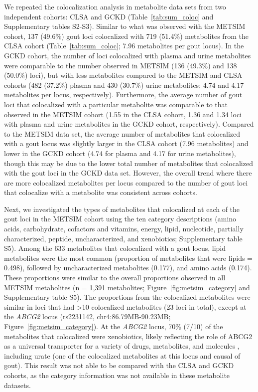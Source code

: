 \documentclass[gucdd,article,submit,pdftex,moreauthors]{Definitions/mdpi}
\begin{document}
We repeated the colocalization analysis in metabolite data sets from two independent cohorts: CLSA and GCKD (Table~\ref{tab:sum_coloc} and Supplementary tables S2-S3).
Similar to what was observed with the METSIM cohort, 137 (49.6\%) gout loci colocalized with 719 (51.4\%) metabolites from the CLSA cohort (Table~\ref{tab:sum_coloc}; 7.96 metabolites per gout locus).
In the GCKD cohort, the number of loci colocalized with plasma and urine metabolites were comparable to the number observed in METSIM (136 (49.3\%) and 138 (50.0\%) loci), but with less metabolites compared to the METSIM and CLSA cohorts (482 (37.2\%) plasma and 430 (30.7\%) urine metabolites; 4.74 and 4.17 metabolites per locus, respectively).
Furthermore, the average number of gout loci that colocalized with a particular metabolite was comparable to that observed in the METSIM cohort (1.55 in the CLSA cohort, 1.36 and 1.34 loci with plasma and urine metabolites in the GCKD cohort, respectively).
Compared to the METSIM data set, the average number of metabolites that colocalized with a gout locus was slightly larger in the CLSA cohort (7.96 metabolites) and lower in the GCKD cohort (4.74 for plasma and 4.17 for urine metabolites), though this may be due to the lower total number of metabolites that colocalized with the gout loci in the GCKD data set.
However, the overall trend where there are more colocalized metabolites per locus compared to the number of gout loci that colocalize with a metabolite was consistent across cohorts.

Next, we investigated the types of metabolites that colocalized at each of the gout loci in the METSIM cohort using the ten category descriptions (amino acids, carbohydrate, cofactors and vitamins, energy, lipid, nucleotide, partially characterized, peptide, uncharacterized, and xenobiotics; Supplementary table S5).
Among the 633 metabolites that colocalized with a gout locus, lipid metabolites were the most common (proportion of metabolites that were lipids = 0.498), followed by uncharacterized metabolites (0.177), and amino acids (0.174).
These proportions were similar to the overall proportions observed in all METSIM metabolites (n = 1,391 metabolites; Figure~\ref{fig:metsim_category} and Supplementary table S5).
The proportions from the colocalized metabolites were similar in loci that had >10 colocalized metabolites (23 loci in total), except at the \textit{ABCG2} locus (rs2231142, chr4:86.79MB-90.23MB; Figure~\ref{fig:metsim_category}).
At the \textit{ABCG2} locus, 70\% (7/10) of the metabolites that colocalized were xenobiotics, likely reflecting the role of ABCG2 as a universal transporter for a variety of drugs, metabolites, and molecules \citep{austin_doyle_multidrug_2003}, including urate (one of the colocalized metabolites at this locus and causal of gout).
This result was not able to be compared with the CLSA and GCKD cohorts, as the category information was not available in these metabolite datasets.
\end{document}
